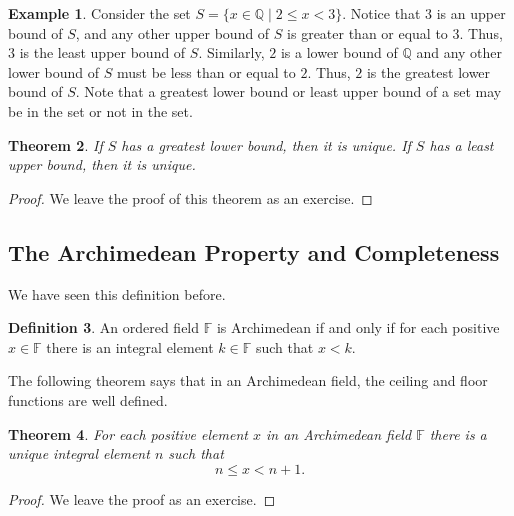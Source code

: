 \documentclass[11pt]{article}
\newtheorem{theorem}{Theorem}[section]
\theoremstyle{definition}
\newtheorem{definition}[theorem]{Definition}
\newtheorem{example}[theorem]{Example}
\begin{document}
\begin{example}
  Consider the set $S = \{ x \in \mathbb{Q} \mid 2 \leq x < 3 \}$. Notice that
  $3$ is an upper bound of $S$, and any other upper bound of $S$ is greater than or 
  equal to $3$. Thus, $3$ is the least upper bound of $S$. Similarly, $2$ is a lower 
  bound of $\mathbb{Q}$ and any other lower bound of $S$ must be less than or
  equal to $2$. Thus, $2$ is the greatest lower bound of $S$.  Note that a greatest 
  lower bound or least upper bound of a set may be in the set or not in the set.
\end{example}

\begin{theorem}
  If $S$ has a greatest lower bound, then it is unique. If $S$ has a least upper bound, then it is unique.
  \label{theorem: glb and lub are unqiue}
\end{theorem}
\begin{proof}
  We leave the proof of this theorem as an exercise.
\end{proof}

\subsection{The Archimedean Property and Completeness}

We have seen this definition before.

\begin{definition}
  An ordered field $\mathbb{F}$ is Archimedean if and only if for each positive $x\in\mathbb{F}$ there is an integral 
  element $k\in\mathbb{F}$ such that $x < k$.
\end{definition}

The following theorem says that in an Archimedean field, the ceiling and floor functions are well defined.

\begin{theorem}
  For each positive element $x$ in an Archimedean field $\mathbb{F}$ there is a unique integral element $n$ such that
  \[ n \leq x < n + 1.\]
  \label{theorem: archimedean implies unique integral element}
\end{theorem}
\begin{proof}
  We leave the proof as an exercise.
\end{proof}
\end{document}
